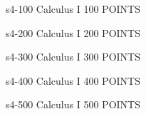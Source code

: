 \documentclass{beamer}
\begin{document}
\content
    {s4-100}                     %
    {Calculus I}                         %
    {100 POINTS}{                       %
        \begin{textarea}[]         %
        \end{textarea}
    }
\content
    {s4-200}                     %
    {Calculus I}                         %
    {200 POINTS}{                       %
        \begin{textarea}[]         %
        \end{textarea}
    }
\content
    {s4-300}                     %
    {Calculus I}                         %
    {300 POINTS}{                       %
        \begin{textarea}[]         %
        \end{textarea}
    }
\content
    {s4-400}                     %
    {Calculus I}                         %
    {400 POINTS}{                       %
        \begin{textarea}[]         %
        \end{textarea}
    }
\content
    {s4-500}                     %
    {Calculus I}                         %
    {500 POINTS}{                       %
        \begin{textarea}[]         %
        \end{textarea}
    }
\end{document}

